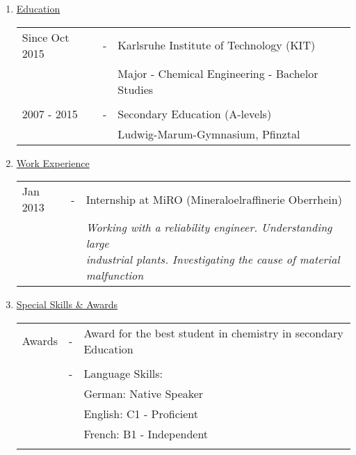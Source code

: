 
\begin{enumerate}[label=\Alph*.]
	\item \underline{Education}
	
	\begin{tabulary}{\textwidth}{@{}p{3.8cm} C L}
		Since Oct 2015 & - & Karlsruhe Institute of Technology (KIT) \\
		& & Major - Chemical Engineering - Bachelor Studies \\
		\\[-0.5em]
		2007 - 2015 & - & Secondary Education (A-levels) \\
		& & Ludwig-Marum-Gymnasium, Pfinztal \\
	\end{tabulary}
	
	\item \underline{Work Experience}
	
	\begin{tabulary}{\textwidth}{@{}p{3.8cm}CL}
		Jan 2013 & - & Internship at MiRO (Mineraloelraffinerie Oberrhein) \\
		& & \textit{Working with a reliability engineer. Understanding large \newline industrial plants. Investigating the cause of material malfunction}\\
	\end{tabulary}
	
	\item \underline{Special Skills \& Awards}
	
	\begin{tabulary}{\textwidth}{@{}p{3.8cm}CL}
		Awards & - & Award for the best student in chemistry in secondary Education\\
		\\[-0.5em]
		& - & Language Skills: \\
		& & German:  Native Speaker\\
		& & English: C1 - Proficient \\
		& & French:  B1 - Independent \\
		\\[-0.5em]
		
	\end{tabulary}
	
\end{enumerate}
